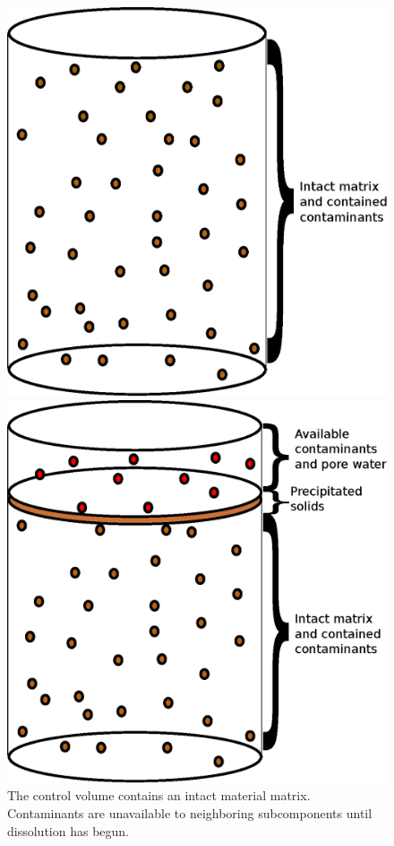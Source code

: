\begin{figure}[h!]
\begin{minipage}[b]{0.5\linewidth}
  \begin{center}
    \includegraphics[width=0.9\linewidth]{mixed_cell/mixed_cell_whole.eps}
  \end{center}
  \caption[Intact Mixed Cell Control Volume]{The control volume contains an 
  intact material matrix. Contaminants are unavailable to neighboring 
  subcomponents until dissolution has begun.}
  \label{fig:intact}
\end{minipage}
\hspace{0.5cm}
\begin{minipage}[b]{0.5\linewidth}
  \begin{center}
    \includegraphics[width=0.9\linewidth]{mixed_cell/mixed_cell_degraded.eps}

\end{center}
\end{minipage}
\end{figure}
